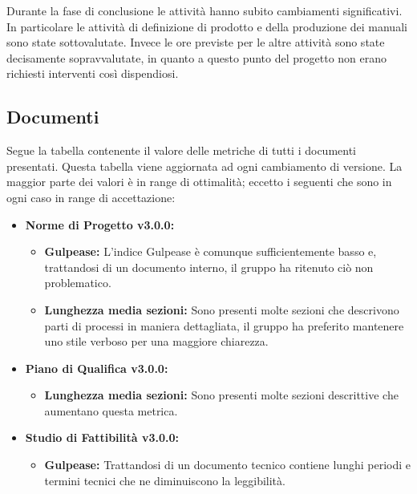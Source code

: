 \documentclass[a4paper]{article}
\begin{document}
				Durante la fase di conclusione le attività hanno subito cambiamenti significativi. In particolare le
				attività di definizione di prodotto e della produzione dei manuali sono state sottovalutate. 
				Invece le ore previste per le altre attività sono state decisamente sopravvalutate, in quanto a questo
				punto del progetto non erano richiesti interventi così dispendiosi.
					
				
			\subsection{Documenti}
			Segue la tabella contenente il valore delle metriche di tutti i documenti presentati. Questa tabella viene aggiornata ad ogni cambiamento di versione. La maggior parte dei valori è in range di ottimalità; eccetto i seguenti che sono in ogni caso in range di accettazione: \\
\begin{itemize}
	\item \textbf{Norme di Progetto v3.0.0:}
		\begin{itemize}
			\item \textbf{Gulpease:} L'indice Gulpease è comunque sufficientemente basso e, trattandosi di un documento interno, il gruppo ha ritenuto ciò non problematico.
			\item \textbf{Lunghezza media sezioni:} Sono presenti molte sezioni che descrivono parti di processi in maniera dettagliata, il gruppo ha preferito mantenere uno stile verboso per una maggiore chiarezza.
		\end{itemize}
	\item \textbf{Piano di Qualifica v3.0.0:}
		\begin{itemize}
			\item \textbf{Lunghezza media sezioni:} Sono presenti molte sezioni descrittive che aumentano questa metrica.
		\end{itemize}
	\item \textbf{Studio di Fattibilità v3.0.0:}
	\begin{itemize}
		\item \textbf{Gulpease:} Trattandosi di un documento tecnico contiene lunghi periodi e termini tecnici che ne diminuiscono la leggibilità.
	\end{itemize}
\end{itemize}
\end{document}

